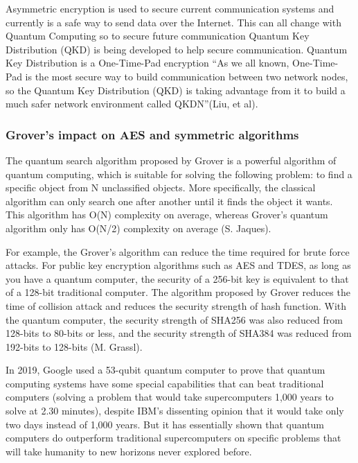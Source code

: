 \documentclass[sigconf]{acmart}
\begin{document}
Asymmetric encryption is used to secure current communication systems and currently is a safe way to send data over the Internet. This can all change with Quantum Computing so to secure future communication Quantum Key Distribution (QKD) is being developed to help secure communication. Quantum Key Distribution is a One-Time-Pad encryption “As we all known, One-Time-Pad is the most secure way to build communication between two network nodes, so the Quantum Key Distribution (QKD) is taking advantage from it to build a much safer network environment called QKDN”(Liu, et al). 

\subsubsection{Grover's impact on AES and symmetric algorithms}
The quantum search algorithm proposed by Grover is a powerful algorithm of quantum computing, which is suitable for solving the following problem: to find a specific object from N unclassified objects. More specifically, the classical algorithm can only search one after another until it finds the object it wants. This algorithm has O(N) complexity on average, whereas Grover's quantum algorithm only has O(N/2) complexity on average (S. Jaques).

For example, the Grover’s algorithm can reduce the time required for brute force attacks. For public key encryption algorithms such as AES and TDES, as long as you have a quantum computer, the security of a 256-bit key is equivalent to that of a 128-bit traditional computer. The algorithm proposed by Grover reduces the time of collision attack and reduces the security strength of hash function. With the quantum computer, the security strength of SHA256 was also reduced from 128-bits to 80-bits or less, and the security strength of SHA384 was reduced from 192-bits to 128-bits (M. Grassl).

In 2019, Google used a 53-qubit quantum computer to prove that quantum computing systems have some special capabilities that can beat traditional computers (solving a problem that would take supercomputers 1,000 years to solve at 2.30 minutes), despite IBM's dissenting opinion that it would take only two days instead of 1,000 years. But it has essentially shown that quantum computers do outperform traditional supercomputers on specific problems that will take humanity to new horizons never explored before.
\end{document}
